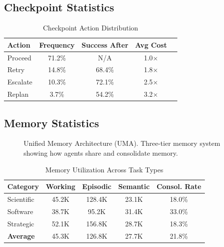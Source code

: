 \documentclass{article}
\theoremstyle{plain}
\theoremstyle{definition}
\theoremstyle{remark}
\begin{document}
\subsection{\rcm{} Checkpoint Statistics}

\begin{table}[H]
	\caption{Checkpoint Action Distribution}
	\centering
	\small
	\begin{tabular}{@{}lcccc@{}}
		\toprule
		\textbf{Action} & \textbf{Frequency} & \textbf{Success After} & \textbf{Avg Cost} \\
		\midrule
		Proceed & 71.2\% & N/A & 1.0$\times$ \\
		Retry & 14.8\% & 68.4\% & 1.8$\times$ \\
		Escalate & 10.3\% & 72.1\% & 2.5$\times$ \\
		Replan & 3.7\% & 54.2\% & 3.2$\times$ \\
		\bottomrule
	\end{tabular}
\end{table}

\subsection{\uma{} Memory Statistics}

\begin{figure}[t]
	\centering
	
	\caption{Unified Memory Architecture (UMA). Three-tier memory system showing how agents share and consolidate memory.}
	\label{fig:framework3}
\end{figure}


\begin{table}[H]
	\caption{Memory Utilization Across Task Types}
	\centering
	\small
	\begin{tabular}{@{}lcccc@{}}
		\toprule
		\textbf{Category} & \textbf{Working} & \textbf{Episodic} & \textbf{Semantic} & \textbf{Consol. Rate} \\
		\midrule
		Scientific & 45.2K & 128.4K & 23.1K & 18.0\% \\
		Software & 38.7K & 95.2K & 31.4K & 33.0\% \\
		Strategic & 52.1K & 156.8K & 28.7K & 18.3\% \\
		\midrule
		\textbf{Average} & 45.3K & 126.8K & 27.7K & 21.8\% \\
		\bottomrule
	\end{tabular}
\end{table}



\end{document}
